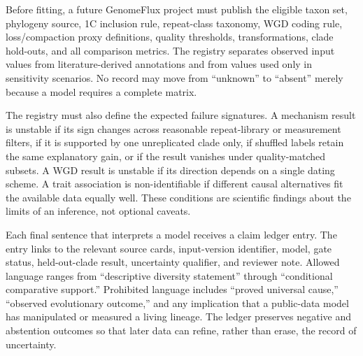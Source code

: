 \documentclass[conference]{IEEEtran}
\newcommand{\gf}{GenomeFlux}
\begin{document}
Before fitting, a future \gf{} project must publish the eligible taxon set, phylogeny source, 1C inclusion rule, repeat-class taxonomy, WGD coding rule, loss/compaction proxy definitions, quality thresholds, transformations, clade hold-outs, and all comparison metrics. The registry separates observed input values from literature-derived annotations and from values used only in sensitivity scenarios. No record may move from “unknown” to “absent” merely because a model requires a complete matrix.

The registry must also define the expected failure signatures. A mechanism result is unstable if its sign changes across reasonable repeat-library or measurement filters, if it is supported by one unreplicated clade only, if shuffled labels retain the same explanatory gain, or if the result vanishes under quality-matched subsets. A WGD result is unstable if its direction depends on a single dating scheme. A trait association is non-identifiable if different causal alternatives fit the available data equally well. These conditions are scientific findings about the limits of an inference, not optional caveats.

Each final sentence that interprets a model receives a claim ledger entry. The entry links to the relevant source cards, input-version identifier, model, gate status, held-out-clade result, uncertainty qualifier, and reviewer note. Allowed language ranges from “descriptive diversity statement” through “conditional comparative support.” Prohibited language includes “proved universal cause,” “observed evolutionary outcome,” and any implication that a public-data model has manipulated or measured a living lineage. The ledger preserves negative and abstention outcomes so that later data can refine, rather than erase, the record of uncertainty.
\end{document}
